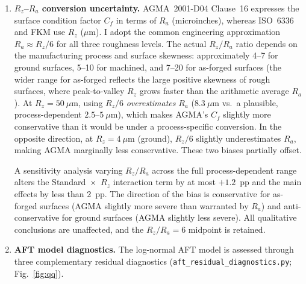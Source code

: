 \documentclass[twocolumn,12pt,a4paper]{article}
\begin{document}
\begin{enumerate}
        ($\approx 0.907$) because the formula is validated only up to
        40~$\mu$m; FKM clamps $K_{F\sigma}$ at 0.55; AGMA's $C_f$
        follows a smooth log-log form without a roughness cap. This
        asymmetry means that at $R_z=50~\mu$m, the ISO--FKM divergence
        is \emph{understated}: ISO's penalty is frozen at the
        $R_z=40~\mu$m value while FKM's and AGMA's penalties continue
        to increase with roughness. The Standard~$\times$~$R_z$
        interaction term (1.2\%) is therefore a conservative estimate
        of the true interaction at high roughness. Removing the ISO cap
        changes the interaction by $+0.3$~pp and leaves the main
        effects within 1~pp of baseline. The cap is retained in the
        main analysis because it reflects the standard's documented
        validity range; readers should note that the ISO-to-FKM gap at
        $R_z=50~\mu$m would be larger under an extrapolated ISO formula.
  \item \textbf{$R_z$--$R_a$ conversion uncertainty.} AGMA~2001-D04
        Clause~16 expresses the surface condition factor $C_f$ in terms
        of $R_a$ (microinches), whereas ISO~6336 and FKM use $R_z$
        ($\mu$m). I adopt the common engineering approximation
        $R_a \approx R_z/6$ for all three roughness levels. The actual
        $R_z/R_a$ ratio depends on the manufacturing process and surface
        skewness: approximately 4--7 for ground surfaces, 5--10 for
        machined, and 7--20 for as-forged surfaces (the wider range for
        as-forged reflects the large positive skewness of rough
        surfaces, where peak-to-valley $R_z$ grows faster than the
        arithmetic average $R_a$). At $R_z=50~\mu$m, using $R_z/6$
        \emph{overestimates} $R_a$ ($8.3~\mu$m vs.\ a plausible,
        process-dependent $2.5$--$5~\mu$m), which makes AGMA's $C_f$ slightly more
        conservative than it would be under a process-specific
        conversion. In the opposite direction, at $R_z=4~\mu$m
        (ground), $R_z/6$ slightly underestimates $R_a$, making AGMA
        marginally less conservative. These two biases partially offset.

        A sensitivity analysis varying $R_z/R_a$ across the full
        process-dependent range alters the
        Standard~$\times$~$R_z$ interaction term by at most $+1.2$~pp
        and the main effects by less than 2~pp. The direction of
        the bias is conservative for as-forged surfaces
        (AGMA slightly more severe than warranted by $R_a$) and
        anti-conservative for ground surfaces (AGMA slightly less
        severe). All qualitative conclusions are unaffected, and the
        $R_z/R_a=6$ midpoint is retained.
  \item \textbf{AFT model diagnostics.} The log-normal AFT model is
        assessed through three complementary residual diagnostics
        (\texttt{aft\_residual\_diagnostics.py}; Fig.~\ref{fig:qq}).


\end{enumerate}
\end{document}
